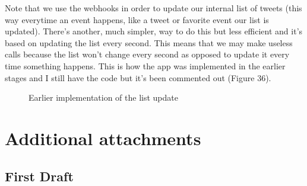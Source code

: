 \documentclass[12pt]{article} %
\begin{document}
\begin{enumerate}
		Note that we use the webhooks in order to update our internal list of tweets (this way everytime an event happens, like a tweet or favorite event our list is updated).
		There's another, much simpler, way to do this but less efficient and it's based on updating the list every second. This means that we may make useless calls because
		the list won't change every second as opposed to update it every time something happens. This is how the app was implemented in the earlier stages and I still have the code
		but it's been commented out (Figure 36).

		\begin{figure}[H] %
		\caption{Earlier implementation of the list update}
		\label{intervalUpdate}
		\end{figure}

	\end{enumerate}



\section{Additional attachments} %

\subsection{First Draft}
\end{document}
